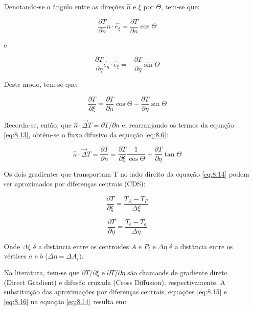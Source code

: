 Denotando-se o ângulo entre as direções $\hat{n}$ e $\xi$ por $\Theta$, tem-se que:

\begin{equation}
    \label{eq:8.11}
    \frac{\partial T}{\partial n} \hat{n} \cdot \hat{e_\xi} = \frac{\partial T}{\partial n} \cos{\Theta}
\end{equation}

e

\begin{equation}
    \label{eq:8.12}
    \frac{\partial T}{\partial \eta} \hat{e_\eta} \cdot \hat{e_\xi} = - \frac{\partial T}{\partial \eta} \sin{\Theta}
\end{equation}

Deste modo, tem-se que:

\begin{equation}
    \label{eq:8.13}
    \frac{\partial T}{\partial \xi} = \frac{\partial T}{\partial n}\cos{\Theta} - \frac{\partial T}{\partial \eta} \sin{\Theta}
\end{equation}

Recorda-se, então, que $\hat{n} \cdot \vec{\Delta}T = \partial T/\partial n$ e, rearranjando os termos da equação \ref{eq:8.13}, obtém-se o fluxo difusivo da equação \ref{eq:8.6}:

\begin{equation}
    \label{eq:8.14}
    \hat{n} \cdot \vec{\Delta}T = \frac{\partial T}{\partial n} = \frac{\partial T}{\partial \xi} \frac{1}{\cos{\Theta}} + \frac{\partial T}{\partial \eta} \tan{\Theta}
\end{equation}

Os dois gradientes que transportam T no lado direito da equação \ref{eq:8.14} podem ser aproximados por diferenças centrais (CDS):

\begin{equation}
    \label{eq:8.15}
    \frac{\partial T}{\partial \xi} = \frac{T_A - T_P}{\Delta \xi}
\end{equation}

\begin{equation}
    \label{eq:8.16}
    \frac{\partial T}{\partial \eta} = \frac{T_b - T_a}{\Delta \eta}
\end{equation}

Onde $\Delta \xi$ é a distância entre os centroides $A$ e $P_i$ e $\Delta \eta$ é a distância entre os vértices $a$ e $b$ ($\Delta \eta = \Delta A_i)$.

Na literatura, tem-se que $\partial T/\partial \xi$ e $\partial T/\partial \eta$ são chamaods de gradiente direto (Direct Gradient) e difusão cruzada (Cross Diffusion), respectivamente. A substituição das aproximações por diferenças centrais, equações \ref{eq:8.15} e \ref{eq:8.16} na equação \ref{eq:8.14} resulta em:

